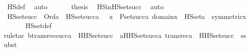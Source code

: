 \begin{isabellebody}
\ HS{\isacharunderscore}{\kern0pt}def\ \isamarkupfalse%
\ auto\ \isanewline
\ \ \isamarkupfalse%
\ \isamarkupfalse%
\ {\isacharquery}{\kern0pt}thesis\ \isamarkupfalse%
\ HS{\isacharunderscore}{\kern0pt}in{\isacharunderscore}{\kern0pt}HS{\isacharunderscore}{\kern0pt}set{\isacharunderscore}{\kern0pt}succ{\isacharprime}{\kern0pt}\ \isamarkupfalse%
\ auto\isanewline
{}\isamarkupfalse%
%
\endisatagproof
{\isafoldproof}%
%
\isadelimproof
\isanewline
%
\endisadelimproof
\isanewline
{}\isamarkupfalse%
\ HS{\isacharunderscore}{\kern0pt}set{\isacharunderscore}{\kern0pt}succ\ {\isacharcolon}{\kern0pt}\ {\isachardoublequoteopen}Ord{\isacharparenleft}{\kern0pt}a{\isacharparenright}{\kern0pt}\ {\isasymLongrightarrow}\ HS{\isacharunderscore}{\kern0pt}set{\isacharparenleft}{\kern0pt}succ{\isacharparenleft}{\kern0pt}a{\isacharparenright}{\kern0pt}{\isacharparenright}{\kern0pt}\ {\isacharequal}{\kern0pt}\ {\isacharbraceleft}{\kern0pt}\ x\ {\isasymin}\ P{\isacharunderscore}{\kern0pt}set{\isacharparenleft}{\kern0pt}succ{\isacharparenleft}{\kern0pt}a{\isacharparenright}{\kern0pt}{\isacharparenright}{\kern0pt}{\isachardot}{\kern0pt}\ domain{\isacharparenleft}{\kern0pt}x{\isacharparenright}{\kern0pt}\ {\isasymsubseteq}\ HS{\isacharunderscore}{\kern0pt}set{\isacharparenleft}{\kern0pt}a{\isacharparenright}{\kern0pt}\ {\isasymand}\ symmetric{\isacharparenleft}{\kern0pt}x{\isacharparenright}{\kern0pt}\ {\isacharbraceright}{\kern0pt}{\isachardoublequoteclose}\ \isanewline
%
\isadelimproof
\ \ %
\endisadelimproof
%
\isatagproof
{}\isamarkupfalse%
\ HS{\isacharunderscore}{\kern0pt}set{\isacharunderscore}{\kern0pt}def\ \isanewline
\ \ \isamarkupfalse%
{\isacharparenleft}{\kern0pt}rule{\isacharunderscore}{\kern0pt}tac\ b{\isacharequal}{\kern0pt}{\isachardoublequoteopen}transrec{}{\isacharparenleft}{\kern0pt}succ{\isacharparenleft}{\kern0pt}a{\isacharparenright}{\kern0pt}{\isacharcomma}{\kern0pt}\ {}{\isacharcomma}{\kern0pt}\ HHS{\isacharunderscore}{\kern0pt}set{\isacharunderscore}{\kern0pt}succ{\isacharparenright}{\kern0pt}{\isachardoublequoteclose}\ \ a{\isacharequal}{\kern0pt}{\isachardoublequoteopen}HHS{\isacharunderscore}{\kern0pt}set{\isacharunderscore}{\kern0pt}succ{\isacharparenleft}{\kern0pt}a{\isacharcomma}{\kern0pt}\ transrec{}{\isacharparenleft}{\kern0pt}a{\isacharcomma}{\kern0pt}\ {}{\isacharcomma}{\kern0pt}\ HHS{\isacharunderscore}{\kern0pt}set{\isacharunderscore}{\kern0pt}succ{\isacharparenright}{\kern0pt}{\isacharparenright}{\kern0pt}{\isachardoublequoteclose}\ \ ssubst{\isacharparenright}{\kern0pt}\isanewline

\end{isabellebody}
